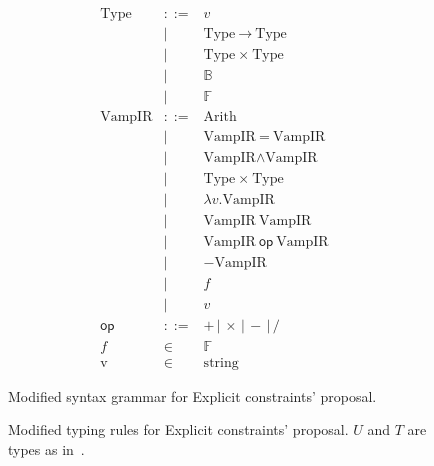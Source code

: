 \documentclass[
    9pt,            
    techreport,       
    affiltop,       
]{art}
\begin{document}
\begin{figure}[!htb]
\begin{equation*}
\begin{array}{rclr}
    \text{Type} &::= &v &\\
    &| &\text{Type} \ \xrightarrow{} \ \text{Type}  & \\
    &| &\text{Type} \ \times \ \text{Type}  & \\
    &| &\mathbb{B}  & \\
    &| &\mathbb{F}  & \\[4mm]
    \text{VampIR} &::=  &\text{Arith} &\\
    &|   &\text{VampIR} \ = \ \text{VampIR} &\\
    &|   &\text{VampIR} \wedge \text{VampIR} &\\
    &|   &\text{Type} \ \times \ \text{Type} &\\
    &|   &\lambda v . \text{VampIR} &\\
    &|   &\text{VampIR}\ \text{VampIR} &\\
    &|   &\text{VampIR} \ \textsf{op} \ \text{VampIR} &\\
    &|  &- \text{VampIR} &\\
    &|  &f  & \\
    &|  &v &\\[2mm]
    \textsf{op} &::=  &+ \,|\, \times \,|\, - \,|\, / &\\
    f &\in  &\mathbb{F} &\\
    \text{v} &\in  &\text{string} &
\end{array}
\end{equation*}
\caption{Modified \VampIR{} syntax grammar for Explicit constraints' proposal.}
\label{fig:modified-grammar}
\end{figure}


\begin{figure}[!htb]
\centering
\begin{spacing}{1.5}
\end{spacing}
\caption{Modified \VampIR{} typing rules for Explicit constraints' proposal. $U$ and $T$ are types as in~.}
\label{fig:grammar}
\end{figure}
\end{document}
